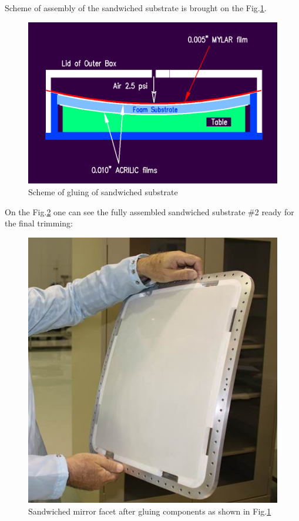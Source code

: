 Scheme of assembly of the sandwiched substrate is brought on the Fig.\ref{fig:Gluing_Sandwich}.
\begin{figure}[h]
    \centering
    \includegraphics[width=0.9\linewidth]{Gluing_Sandwich_New.png}
    \caption{Scheme of gluing of sandwiched substrate}
    \label{fig:Gluing_Sandwich}
\end{figure}{}
On the Fig.\ref{fig:Assembled_Sandwich} one can see the fully assembled sandwiched substrate \#2 ready for the final trimming: 
\begin{figure}[h]
    \centering
    \includegraphics[width=0.9\linewidth]{Assembled_Sandwich.jpg}
    \caption{Sandwiched mirror facet after gluing components as shown in Fig.\ref{fig:Gluing_Sandwich}}
    \label{fig:Assembled_Sandwich}
\end{figure}{}


